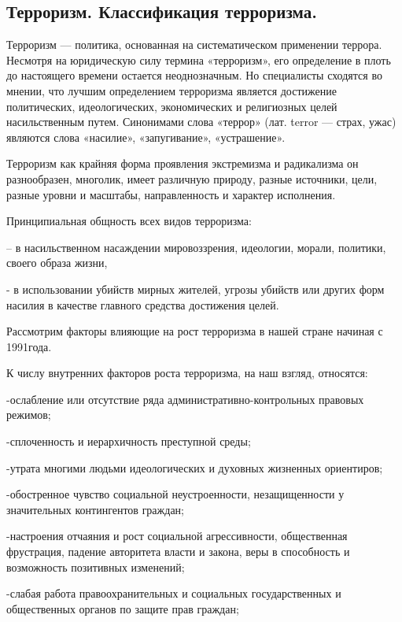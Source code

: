 \documentclass[a4paper, 12pt]{article}
\theoremstyle{definition}
\begin{document}
        \subsection{Терроризм. Классификация терроризма.}

        Терроризм — политика, основанная на систематическом применении террора. Несмотря на юридическую силу термина «терроризм», его определение в плоть до настоящего времени остается неоднозначным.  Но специалисты сходятся во мнении, что лучшим определением терроризма является достижение политических, идеологических, экономических и религиозных целей насильственным путем. Синонимами слова «террор» (лат. terror — страх, ужас) являются слова «насилие», «запугивание», «устрашение». 

        Терроризм как крайняя форма проявления экстремизма и радикализма он разнообразен, многолик, имеет различную природу, разные источники, цели, разные уровни и масштабы, направленность и характер исполнения. 

        Принципиальная общность всех видов терроризма: 

        – в насильственном насаждении мировоззрения, идеологии, морали, политики, своего образа жизни, 

        - в использовании убийств мирных жителей,       угрозы убийств или других форм насилия в качестве главного средства достижения целей.

        Рассмотрим факторы влияющие на рост терроризма в нашей стране начиная с 1991года.

        К числу внутренних факторов роста терроризма, на наш взгляд, относятся:

        -ослабление или отсутствие ряда административно-контрольных правовых режимов;

        -сплоченность и иерархичность преступной среды;

        -утрата многими людьми идеологических и духовных жизненных ориентиров;

        -обостренное чувство социальной неустроенности, незащищенности у значительных контингентов граждан;

        -настроения отчаяния и рост социальной агрессивности, общественная\\ фрустрация, падение авторитета власти и закона, веры в способность и возможность позитивных изменений;

        -слабая работа правоохранительных и социальных государственных и общественных органов по защите прав граждан; 
        
\end{document}
